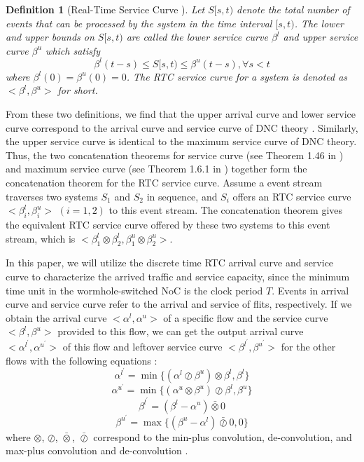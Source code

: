 \documentclass[10pt,journal]{IEEEtran}
\newtheorem{definition}{Definition}
\begin{document}
\begin{definition}[Real-Time Service Curve \cite{1253607}]
Let $S[s,t)$ denote the total number of events that can be processed by the system in the time interval $[s,t)$. The lower and upper bounds on $S[s,t)$ are called the lower service curve $\beta^l$ and upper service curve $\beta^u$ which satisfy
$$\beta^l(t-s)\leq S[s,t)\leq \beta^u(t-s),\forall s<t$$
where $\beta^l(0)=\beta^u(0)=0$. The RTC service curve for a system is denoted as $<\beta^l,\beta^u>$ for short.
\end{definition}

From these two definitions, we find that the upper arrival curve and lower service curve correspond to the arrival curve and service curve of DNC theory \cite{Boudec2001Network}. Similarly, the upper service curve is identical to the maximum service curve of DNC theory. Thus, the two concatenation theorems for service curve (see Theorem 1.46 in \cite{Boudec2001Network}) and maximum service curve (see Theorem 1.6.1 in \cite{Boudec2001Network}) together form the concatenation theorem for the RTC service curve. Assume a event stream traverses two systems $S_1$ and $S_2$ in sequence, and $S_i$ offers an RTC service curve $<\beta^l_i,\beta^u_i>$ $(i=1,2)$ to this event stream. The concatenation theorem gives the equivalent RTC service curve offered by these two systems to this event stream, which is $<\beta^l_1\otimes\beta^l_2,\beta^u_1\otimes\beta^u_2>$.

In this paper, we will utilize the discrete time RTC arrival curve and service curve to characterize the arrived traffic and service capacity, since the minimum time unit in the wormhole-switched NoC is the clock period $T$. Events in arrival curve and service curve refer to the arrival and service of flits, respectively. If we obtain the arrival curve $<\alpha^l,\alpha^u>$ of a specific flow and the service curve $<\beta^l,\beta^u>$ provided to this flow, we can get the output arrival curve $<\alpha^{l^\prime},\alpha^{u^\prime}>$ of this flow and leftover service curve $<\beta^{l^\prime},\beta^{u^\prime}>$ for the other flows with the following equations \cite{1253607}:
\begin{equation}\label{alphal}
\alpha^{l^\prime}=\min\{(\alpha^l\oslash\beta^u)\otimes\beta^l,\beta^l\}
\end{equation}
\begin{equation}\label{alphau}
\alpha^{u^\prime}=\min\{(\alpha^u\otimes\beta^u)\oslash\beta^l,\beta^u\}
\end{equation}
\begin{equation}\label{betal}
\beta^{l^\prime}=(\beta^l-\alpha^u)\bar{\otimes}0
\end{equation}
\begin{equation}\label{betau}
\beta^{u^\prime}=\max\{(\beta^u-\alpha^l)\bar{\oslash}0,0\}
\end{equation}
where $\otimes$, $\oslash$, $\bar{\otimes}$, $\bar{\oslash}$ correspond to the min-plus convolution, de-convolution, and max-plus convolution and de-convolution \cite{Boudec2001Network}.
\end{document}
